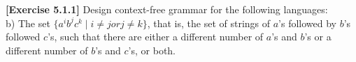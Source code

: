 \textbf{[Exercise 5.1.1]} Design context-free grammar for the following languages:\\
b) The set $\{a^ib^jc^k \mid i \neq j or j \neq k\}$, that is, the set of strings
of $a$'s followed by $b$'s followed $c$'s, such that there are either a different
number of $a$'s and $b$'s or a different number of $b$'s and $c$'s, or both.